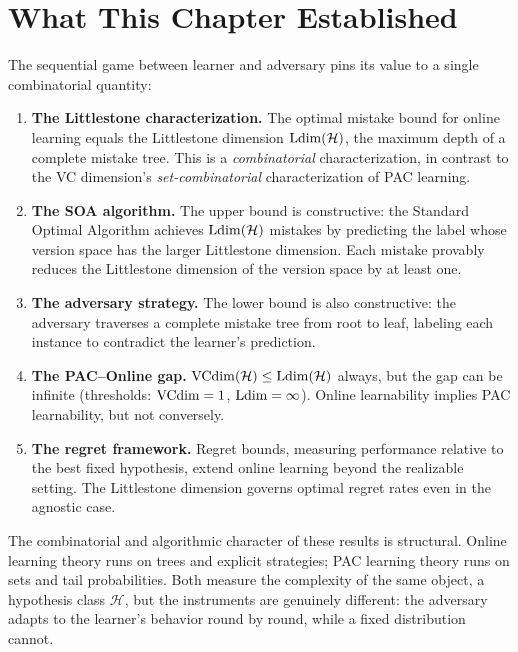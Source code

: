 \section{What This Chapter Established}
\label{sec:ch6-summary}

The sequential game between learner and adversary pins its value to a single combinatorial quantity:

\begin{enumerate}[leftmargin=*, itemsep=3pt]
\item \textbf{The Littlestone characterization.} The optimal mistake bound for online learning equals the Littlestone dimension $\mathrm{Ldim}(\mathcal{H})$, the maximum depth of a complete mistake tree. This is a \emph{combinatorial} characterization, in contrast to the VC dimension's \emph{set-combinatorial} characterization of PAC learning.

\item \textbf{The SOA algorithm.} The upper bound is constructive: the Standard Optimal Algorithm achieves $\mathrm{Ldim}(\mathcal{H})$ mistakes by predicting the label whose version space has the larger Littlestone dimension. Each mistake provably reduces the Littlestone dimension of the version space by at least one.

\item \textbf{The adversary strategy.} The lower bound is also constructive: the adversary traverses a complete mistake tree from root to leaf, labeling each instance to contradict the learner's prediction.

\item \textbf{The PAC--Online gap.} $\mathrm{VCdim}(\mathcal{H}) \leq \mathrm{Ldim}(\mathcal{H})$ always, but the gap can be infinite (thresholds: $\mathrm{VCdim} = 1$, $\mathrm{Ldim} = \infty$). Online learnability implies PAC learnability, but not conversely.

\item \textbf{The regret framework.} Regret bounds, measuring performance relative to the best fixed hypothesis, extend online learning beyond the realizable setting. The Littlestone dimension governs optimal regret rates even in the agnostic case.
\end{enumerate}

The combinatorial and algorithmic character of these results is structural. Online learning theory runs on trees and explicit strategies; PAC learning theory runs on sets and tail probabilities. Both measure the complexity of the same object, a hypothesis class $\mathcal{H}$, but the instruments are genuinely different: the adversary adapts to the learner's behavior round by round, while a fixed distribution cannot.

